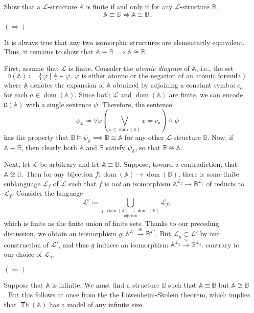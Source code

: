 \documentclass[10pt,letterpaper,cm]{nupset}
\theoremstyle{definition}
\theoremstyle{theorem}
\theoremstyle{remark}
\newcommand{\A}{\mathbb A}
\renewcommand{\L}{\mathcal L}
\newcommand{\B}{\mathbb{B}}
\newcommand{\1}{\mathbb{1}}
\newcommand{\0}{\vec 0}
\DeclareMathOperator{\dom}{dom}
\DeclareMathOperator{\thh}{\mathsf{Th}}
\begin{document}
\begin{problem}[2.]
Show that a $\L$-structure $\A$ is finite if and only if for any $\L$-structure $\B$,
\[
\A \equiv \B \iff \A \cong \B
.\]
\end{problem}
\begin{solution}

$(\Longrightarrow)$

\smallskip

It is always true that any two isomorphic structures are elementarily equivalent. Thus, it remains to show that $\A \equiv \B \implies \A \cong \B$.

\smallskip

First, assume that $\L$ is finite. Consider the \textit{atomic diagram} of $\A$, i.e., the set $$\mathtt{D}(\A)\coloneqq \left\{\varphi \mid \underline{\A} \models \varphi, \  \varphi \text{ is either atomic or the negation of an atomic formula}\right\}$$ where $\underline{\A}$ denotes the expansion of $\A$ obtained by adjoining a constant symbol $c_a$ for each $a\in \dom(\A)$. Since both $\L$ and $\dom(\A)$ are finite, we can encode $\mathtt{D}(\A)$ with a single sentence $\psi$. Therefore, the sentence $$\psi_{\A} \coloneqq \forall{x}\left(\bigvee_{a\in \dom(\A)} x=c_a\right) \land \psi$$ has the property that $\underline{\B} \models \psi_{\A} \implies \B \cong \A$ for any other $\L$-structure $\B$. Now, if $\A \equiv \B$, then clearly both $\underline{\A}$ and $\underline{\B}$ satisfy $\psi_{\A}$, so that $\B \cong \A$.

\smallskip

Next, let $\L$ be arbitrary and let $\A \equiv \B$. Suppose, toward a contradiction, that $\A \not\cong \B$. Then for any bijection $f: \dom(\A) \to \dom(\B)$, there is some finite sublanguage $\L_f$ of $\L$ such that $f$ is \emph{not} an isomorphism $\A^{\L_f}\to \B^{\L_f}$ of reducts to $\L_f$. Consider the language $$\L' \coloneqq \bigcup_{\underset{\text{bijection}}{f:\dom(\A)\to \dom(\B)}}\L_f,$$ which is finite as the finite union of finite sets. Thanks to our preceding discussion, we obtain an isomorphism $g: \A^{\L'}\overset{\cong}{\longrightarrow} \B^{\L'}$. But $\L_g \subset \L'$ by our construction of $\L'$, and thus $g$ induces an isomorphism $\A^{\L_g}\overset{\cong}{\longrightarrow} \B^{\L_g}$, contrary to our choice of $\L_g$.

\medskip

$(\Longleftarrow)$

\smallskip

Suppose that $\A$ is infinite. We must find a structure $\B$ such that $\A \equiv \B$ but $\A \not\cong \B$. But this follows at once from the the L\"owenheim-Skolem theorem, which implies that $\thh(\A)$ has a model of any infinite size. 

\end{solution}
\end{document}
